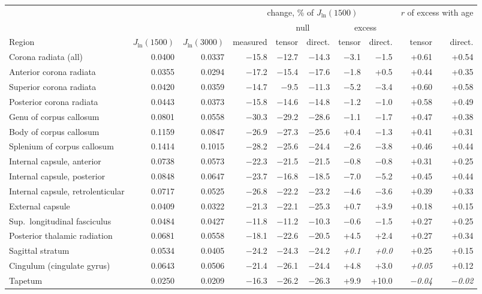 \begin{tabular}{@{}lrrrrrrrrr@{}}
\toprule
 & & & \multicolumn{5}{c}{change, \% of $J_{\ln}(1500)$} & \multicolumn{2}{c}{$r$ of excess with age}\\
\cmidrule(lr){4-8}\cmidrule(l){9-10}
 & & & & \multicolumn{2}{c}{null} & \multicolumn{2}{c}{excess} & & \\
\cmidrule(lr){5-6}\cmidrule(lr){7-8}
Region & $J_{\ln}(1500)$ & $J_{\ln}(3000)$ & measured & tensor & direct. & tensor & direct. & tensor & direct.\\
\midrule
Corona radiata (all) & 0.0400 & 0.0337 & $-$15.8 & $-$12.7 & $-$14.3 & $-$3.1 & $-$1.5 & +0.61 & +0.54\\
Anterior corona radiata & 0.0355 & 0.0294 & $-$17.2 & $-$15.4 & $-$17.6 & $-$1.8 & +0.5 & +0.44 & +0.35\\
Superior corona radiata & 0.0420 & 0.0359 & $-$14.7 & $-$9.5 & $-$11.3 & $-$5.2 & $-$3.4 & +0.60 & +0.58\\
Posterior corona radiata & 0.0443 & 0.0373 & $-$15.8 & $-$14.6 & $-$14.8 & $-$1.2 & $-$1.0 & +0.58 & +0.49\\
Genu of corpus callosum & 0.0801 & 0.0558 & $-$30.3 & $-$29.2 & $-$28.6 & $-$1.1 & $-$1.7 & +0.47 & +0.38\\
Body of corpus callosum & 0.1159 & 0.0847 & $-$26.9 & $-$27.3 & $-$25.6 & +0.4 & $-$1.3 & +0.41 & +0.31\\
Splenium of corpus callosum & 0.1414 & 0.1015 & $-$28.2 & $-$25.6 & $-$24.4 & $-$2.6 & $-$3.8 & +0.46 & +0.44\\
Internal capsule, anterior & 0.0738 & 0.0573 & $-$22.3 & $-$21.5 & $-$21.5 & $-$0.8 & $-$0.8 & +0.31 & +0.25\\
Internal capsule, posterior & 0.0848 & 0.0647 & $-$23.7 & $-$16.8 & $-$18.5 & $-$7.0 & $-$5.2 & +0.45 & +0.44\\
Internal capsule, retrolenticular & 0.0717 & 0.0525 & $-$26.8 & $-$22.2 & $-$23.2 & $-$4.6 & $-$3.6 & +0.39 & +0.33\\
External capsule & 0.0409 & 0.0322 & $-$21.3 & $-$22.1 & $-$25.3 & +0.7 & +3.9 & +0.18 & +0.15\\
Sup.\ longitudinal fasciculus & 0.0484 & 0.0427 & $-$11.8 & $-$11.2 & $-$10.3 & $-$0.6 & $-$1.5 & +0.27 & +0.25\\
Posterior thalamic radiation & 0.0681 & 0.0558 & $-$18.1 & $-$22.6 & $-$20.5 & +4.5 & +2.4 & +0.27 & +0.34\\
Sagittal stratum & 0.0534 & 0.0405 & $-$24.2 & $-$24.3 & $-$24.2 & \textit{+0.1} & \textit{+0.0} & +0.25 & +0.15\\
Cingulum (cingulate gyrus) & 0.0643 & 0.0506 & $-$21.4 & $-$26.1 & $-$24.4 & +4.8 & +3.0 & \textit{+0.05} & +0.12\\
Tapetum & 0.0250 & 0.0209 & $-$16.3 & $-$26.2 & $-$26.3 & +9.9 & +10.0 & \textit{$-$0.04} & \textit{$-$0.02}\\
\bottomrule
\end{tabular}